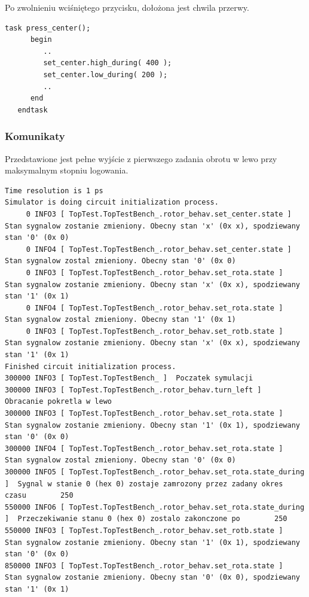 \documentclass[a4paper,12pt]{article}
\begin{document}
Po zwolnieniu wciśniętego przycisku, dołożona jest chwila przerwy.
\begin{lstlisting}[label=Rotor_behav,caption=Rotor\_behav.v]
   task press_center();
      begin
         ..
         set_center.high_during( 400 );
         set_center.low_during( 200 );
         ..
      end
   endtask
\end{lstlisting}

\subsubsection{Komunikaty}

Przedstawione jest pełne wyjście z pierwszego zadania obrotu w lewo przy maksymalnym stopniu logowania.

\begin{lstlisting}
Time resolution is 1 ps
Simulator is doing circuit initialization process.
     0 INFO3 [ TopTest.TopTestBench_.rotor_behav.set_center.state ]  Stan sygnalow zostanie zmieniony. Obecny stan 'x' (0x x), spodziewany stan '0' (0x 0)
     0 INFO4 [ TopTest.TopTestBench_.rotor_behav.set_center.state ]  Stan sygnalow zostal zmieniony. Obecny stan '0' (0x 0)
     0 INFO3 [ TopTest.TopTestBench_.rotor_behav.set_rota.state ]  Stan sygnalow zostanie zmieniony. Obecny stan 'x' (0x x), spodziewany stan '1' (0x 1)
     0 INFO4 [ TopTest.TopTestBench_.rotor_behav.set_rota.state ]  Stan sygnalow zostal zmieniony. Obecny stan '1' (0x 1)
     0 INFO3 [ TopTest.TopTestBench_.rotor_behav.set_rotb.state ]  Stan sygnalow zostanie zmieniony. Obecny stan 'x' (0x x), spodziewany stan '1' (0x 1)
Finished circuit initialization process.
300000 INFO3 [ TopTest.TopTestBench_ ]  Poczatek symulacji
300000 INFO3 [ TopTest.TopTestBench_.rotor_behav.turn_left ]  Obracanie pokretla w lewo
300000 INFO3 [ TopTest.TopTestBench_.rotor_behav.set_rota.state ]  Stan sygnalow zostanie zmieniony. Obecny stan '1' (0x 1), spodziewany stan '0' (0x 0)
300000 INFO4 [ TopTest.TopTestBench_.rotor_behav.set_rota.state ]  Stan sygnalow zostal zmieniony. Obecny stan '0' (0x 0)
300000 INFO5 [ TopTest.TopTestBench_.rotor_behav.set_rota.state_during ]  Sygnal w stanie 0 (hex 0) zostaje zamrozony przez zadany okres czasu        250
550000 INFO6 [ TopTest.TopTestBench_.rotor_behav.set_rota.state_during ]  Przeczekiwanie stanu 0 (hex 0) zostalo zakonczone po        250
550000 INFO3 [ TopTest.TopTestBench_.rotor_behav.set_rotb.state ]  Stan sygnalow zostanie zmieniony. Obecny stan '1' (0x 1), spodziewany stan '0' (0x 0)
850000 INFO3 [ TopTest.TopTestBench_.rotor_behav.set_rota.state ]  Stan sygnalow zostanie zmieniony. Obecny stan '0' (0x 0), spodziewany stan '1' (0x 1)

\end{lstlisting}
\end{document}
